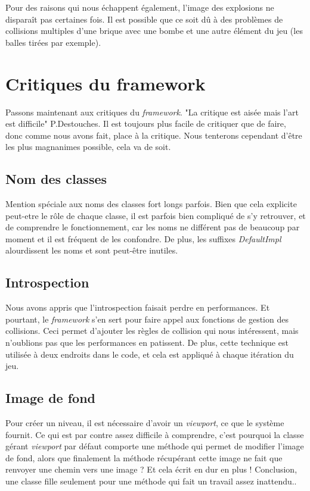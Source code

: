 \documentclass[a4paper,10pt]{article}
\begin{document}

Pour des raisons qui nous échappent également, l'image des explosions ne disparaît pas certaines fois. Il est possible
que ce soit dû à des problèmes de collisions multiples d'une brique avec une bombe et une autre élément du jeu (les
balles tirées par exemple).


\section{Critiques du framework }
    Passons maintenant aux critiques du \textit{framework}. "La critique est aisée mais l'art est difficile" P.Destouches.
    Il est toujours plus facile de critiquer que de faire, donc comme nous avons fait, place à la critique. Nous tenterons
    cependant d'être les plus magnanimes possible, cela va de soit.

    \subsection{Nom des classes}
        Mention spéciale aux noms des classes fort longs parfois. Bien que cela explicite peut-etre le rôle
        de chaque classe, il est parfois bien compliqué de s'y retrouver, et de comprendre le fonctionnement,
        car les noms ne différent pas de beaucoup par moment et il est fréquent de les confondre.
        De plus, les suffixes \textit{DefaultImpl} alourdissent les noms et sont peut-être inutiles.

    \subsection{Introspection}
       	 Nous avons appris que l'introspection faisait perdre en performances. Et pourtant, le \textit{framework} s'en sert
        pour faire appel aux fonctions de gestion des collisions. Ceci permet d'ajouter les règles de collision
        qui nous intéressent, mais n'oublions pas que les performances en patissent. De plus, cette technique est
        utilisée à deux endroits dans le code, et cela est appliqué à chaque itération du jeu.

    \subsection{Image de fond}
        Pour créer un niveau, il est nécessaire d'avoir un \textit{viewport}, ce que le système fournit. Ce qui est
        par contre assez difficile à comprendre, c'est pourquoi la classe gérant \textit{viewport} par défaut
        comporte une méthode qui permet de modifier l'image de fond, alors que finalement la méthode récupérant
        cette image ne fait que renvoyer une chemin vers une image ? Et cela écrit en dur en plus ! Conclusion, une classe
        fille seulement pour une méthode qui fait un travail assez inattendu..
\end{document}
